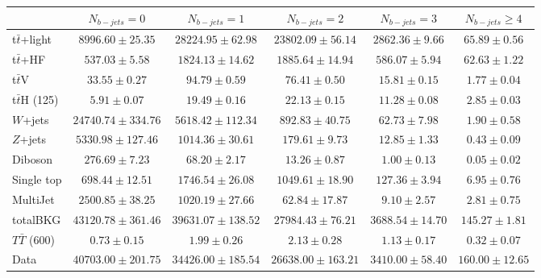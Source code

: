 \begin{tabular}{l c c c c c } \toprule
 & $N_{b-jets}= 0$ & $N_{b-jets}= 1$ & $N_{b-jets}= 2$ & $N_{b-jets}= 3$ & $N_{b-jets}\geq 4$ \\ \midrule 
 t$\bar{t}$+light & $8996.60 \pm 25.35$  & $28224.95 \pm 62.98$  & $23802.09 \pm 56.14$  & $2862.36 \pm 9.66$  & $65.89 \pm 0.56$  \\ 
 t$\bar{t}$+HF & $537.03 \pm 5.58$  & $1824.13 \pm 14.62$  & $1885.64 \pm 14.94$  & $586.07 \pm 5.94$  & $62.63 \pm 1.22$  \\ \midrule 
 t$\bar{t}$V & $33.55 \pm 0.27$  & $94.79 \pm 0.59$  & $76.41 \pm 0.50$  & $15.81 \pm 0.15$  & $1.77 \pm 0.04$  \\ 
 t$\bar{t}$H (125) & $5.91 \pm 0.07$  & $19.49 \pm 0.16$  & $22.13 \pm 0.15$  & $11.28 \pm 0.08$  & $2.85 \pm 0.03$  \\ 
 $W$+jets & $24740.74 \pm 334.76$  & $5618.42 \pm 112.34$  & $892.83 \pm 40.75$  & $62.73 \pm 7.98$  & $1.90 \pm 0.58$  \\ 
 $Z$+jets & $5330.98 \pm 127.46$  & $1014.36 \pm 30.61$  & $179.61 \pm 9.73$  & $12.85 \pm 1.33$  & $0.43 \pm 0.09$  \\ 
 Diboson & $276.69 \pm 7.23$  & $68.20 \pm 2.17$  & $13.26 \pm 0.87$  & $1.00 \pm 0.13$  & $0.05 \pm 0.02$  \\ 
 Single top & $698.44 \pm 12.51$  & $1746.54 \pm 26.08$  & $1049.61 \pm 18.90$  & $127.36 \pm 3.94$  & $6.95 \pm 0.76$  \\ 
 MultiJet & $2500.85 \pm 38.25$  & $1020.19 \pm 27.66$  & $62.84 \pm 17.87$  & $9.10 \pm 2.57$  & $2.81 \pm 0.75$  \\ \midrule 
 totalBKG & $43120.78 \pm 361.46$  & $39631.07 \pm 138.52$  & $27984.43 \pm 76.21$  & $3688.54 \pm 14.70$  & $145.27 \pm 1.81$  \\ \midrule 
 $T\bar{T}$ (600) & $0.73 \pm 0.15$  & $1.99 \pm 0.26$  & $2.13 \pm 0.28$  & $1.13 \pm 0.17$  & $0.32 \pm 0.07$  \\ \midrule 
 Data & $40703.00 \pm 201.75$  & $34426.00 \pm 185.54$  & $26638.00 \pm 163.21$  & $3410.00 \pm 58.40$  & $160.00 \pm 12.65$  \\ 
 \bottomrule\end{tabular}